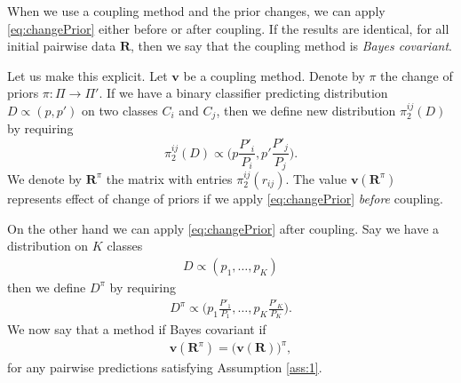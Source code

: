 \documentclass[twoside,11pt]{article}
\begin{document}
When we use a coupling method and the prior changes, we  can apply \eqref{eq:changePrior} either before or after coupling. If the results are identical, for all initial pairwise data $\boldsymbol{R}$, then we say that the coupling method is \emph{Bayes covariant}. 

Let us make this explicit. Let $\boldsymbol{v}$ be a coupling method. Denote by  $\pi$ the change of priors $\pi:\Pi \rightarrow \Pi'$. If we have a  binary classifier predicting distribution $D \propto (p, p')$ on two classes $C_i$ and $C_j$, then we define new distribution $\pi_2^{ij}(D)$ by requiring
$$
\pi_2^{ij}(D) \propto \biggl(p \frac{P'_i}{P_i},p' \frac{P'_j}{P_j}\biggr).
$$
We denote by $\boldsymbol{R}^\pi$ the matrix with entries $\pi_2^{ij}(r_{ij})$. The value $\boldsymbol{v}(\boldsymbol{R}^\pi)$ represents effect of change of priors if we apply \eqref{eq:changePrior} \emph{before} coupling.

On the other hand we can apply \eqref{eq:changePrior} after coupling. Say we have a distribution on $K$ classes
\begin{align}
D \propto (p_1, \ldots, p_K)
\end{align}
then we define $D^\pi$ by requiring 
\begin{align}
D^\pi \propto \biggl(p_1 \frac{P'_1}{P_1}, \ldots, p_K \frac{P'_K}{P_K}\biggr).
\end{align}
We now say that a method if Bayes covariant if
\begin{align}
\boldsymbol{v}(\boldsymbol{R}^\pi)=	\bigl(\boldsymbol{v}(\boldsymbol{R})\bigr)^\pi,
\end{align}
for any pairwise predictions satisfying Assumption \ref{ass:1}.


%
\end{document}
